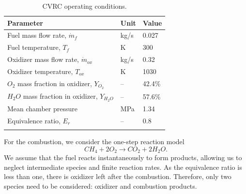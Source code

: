 \begin{table} [h]
	\centering
	\caption{CVRC operating conditions.}
	\centering
	\begin{tabular}{l l l}
		\toprule
		\centering
		Parameter & Unit & Value \\
		\midrule
		Fuel mass flow rate, $\dot{m}_{f}$ & kg/s & 0.027   \\
		Fuel temperature, $T_{f}$ & K & 300   \\
		Oxidizer mass flow rate, $\dot{m}_{ox}$ & kg/s & 0.32   \\
		Oxidizer temperature, $T_{ox}$ & K & 1030   \\
		$O_2$ mass fraction in oxidizer, $Y_{O_2}$ & -- & 42.4\%   \\
		$H_2O$ mass fraction in oxidizer, $Y_{H_2O}$ & -- & 57.6\%   \\
		Mean chamber pressure & MPa & 1.34 \\
		Equivalence ratio, $E_r$ & -- & 0.8 \\
		\bottomrule
		\label{p4.tab:operating-conditions}
	\end{tabular} 
\end{table}
For the combustion, we consider the one-step reaction model
\begin{equation*}\label{p4.eq:combustion}
CH_4 + 2O_2 \rightarrow CO_2 + 2H_2O.
\end{equation*}
We assume that the fuel reacts instantaneously to form products, allowing us to neglect intermediate species and finite reaction rates. As the equivalence ratio is less than one, there is oxidizer left after the combustion. Therefore, only two species need to be considered: oxidizer and combustion products.


